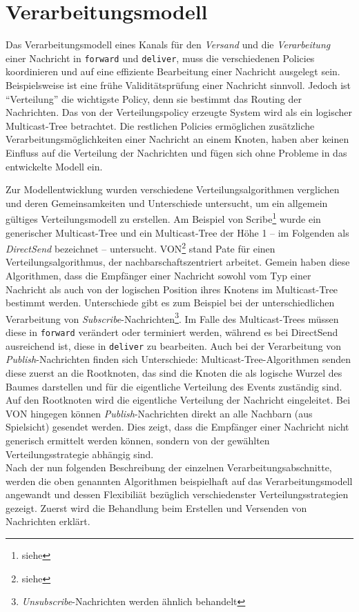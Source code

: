 \section{Verarbeitungsmodell}
Das Verarbeitungsmodell eines Kanals für den \emph{Versand} und die \emph{Verarbeitung} einer Nachricht in \texttt{forward} und \texttt{deliver}, muss die verschiedenen Policies koordinieren und auf eine effiziente Bearbeitung einer Nachricht ausgelegt sein. Beispielsweise ist eine frühe Validitätsprüfung einer Nachricht sinnvoll. Jedoch ist \enquote{Verteilung} die wichtigste Policy, denn sie bestimmt das Routing der Nachrichten. Das von der Verteilungspolicy erzeugte System wird als ein logischer Multicast-Tree betrachtet. Die restlichen Policies ermöglichen zusätzliche Verarbeitungsmöglichkeiten einer Nachricht an einem Knoten, haben aber keinen Einfluss auf die Verteilung der Nachrichten und fügen sich ohne Probleme in das entwickelte Modell ein. 

Zur Modellentwicklung wurden verschiedene Verteilungsalgorithmen verglichen und deren Gemeinsamkeiten und Unterschiede untersucht, um ein allgemein gültiges Verteilungsmodell zu erstellen. Am Beispiel von Scribe\footnote{siehe } wurde ein generischer Multicast-Tree und ein Multicast-Tree der Höhe 1 -- im Folgenden als \emph{DirectSend} bezeichnet -- untersucht. VON\footnote{siehe } stand Pate für einen Verteilungsalgorithmus, der nachbarschaftszentriert arbeitet. Gemein haben diese Algorithmen, dass die Empfänger einer Nachricht sowohl vom Typ einer Nachricht als auch von der logischen Position ihres Knotens im Multicast-Tree bestimmt werden. Unterschiede gibt es zum Beispiel bei der unterschiedlichen Verarbeitung von \emph{Subscribe}-Nachrichten\footnote{\emph{Unsubscribe}-Nachrichten werden ähnlich behandelt}. Im Falle des Multicast-Trees müssen diese in \texttt{forward} verändert oder terminiert werden, während es bei DirectSend ausreichend ist, diese in \texttt{deliver} zu bearbeiten. Auch bei der Verarbeitung von \emph{Publish}-Nachrichten finden sich Unterschiede: Multicast-Tree-Algorithmen senden diese zuerst an die Rootknoten, das sind die Knoten die als logische Wurzel des Baumes darstellen und für die eigentliche Verteilung des Events zuständig sind. Auf den Rootknoten wird die eigentliche Verteilung der Nachricht eingeleitet. Bei VON hingegen können \emph{Publish}-Nachrichten direkt an alle Nachbarn (aus Spielsicht) gesendet werden. Dies zeigt, dass die Empfänger einer Nachricht nicht generisch ermittelt werden können, sondern von der gewählten Verteilungsstrategie abhängig sind.\\
Nach der nun folgenden Beschreibung der einzelnen Verarbeitungsabschnitte, werden die oben genannten Algorithmen beispielhaft auf das Verarbeitungsmodell angewandt und dessen Flexibiliät bezüglich verschiedenster Verteilungsstrategien gezeigt. Zuerst wird die Behandlung beim Erstellen und Versenden von Nachrichten erklärt.

